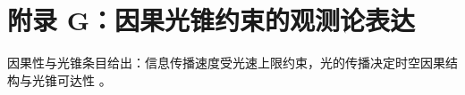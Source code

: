 \section{附录 G：因果光锥约束的观测论表达}

因果性与光锥条目给出：信息传播速度受光速上限约束，光的传播决定时空因果结构与光锥可达性 \cite{EinsteinOnlineCausal}。

